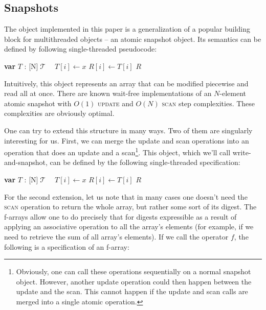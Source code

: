 \documentclass[a4paper,11pt]{article}
\def\T{\ensuremath{\operatorname{\mathcal{T}}}\text{ }}
\newcommand{\fn}[1]{\textsc{#1}}
\newcommand{\var}[2]{\textbf{var }#1 : #2}
\newcommand{\arrayspec}[1]{\text{array}[#1]\text{ of }}
\begin{document}
\subsection{Snapshots}

The object implemented in this paper is a generalization of a popular building block for multithreaded objects
-- an atomic snapshot object\cite{snapshot-idea}. Its semantics can be defined by following single-threaded pseudocode:

\begin{algorithmic}[1]
	\State\var{$T$}{\arrayspec{N}$\T$}
	\State $T[i] \gets x$
\EndFunction
{}
		\State $R[i] \gets T[i]$
	\EndFor
	\State\Return $R$
\EndFunction
\end{algorithmic}

Intuitively, this object represents an array that can be modified piecewise and read all at once.
There are known wait-free implementations of an $N$-element atomic snapshot with $O(1)$ \fn{update} and $O(N)$ \fn{scan} step complexities\cite{snapshot-impl}. These complexities are obviously
optimal.

One can try to extend this structure in many ways. Two of them are singularly interesting for us.
First, we can merge the update and scan operations
into an operation that does an update and a scan\footnote{Obviously, one can call these operations sequentially
on a normal snapshot object. However, another update operation could then happen between the update and the scan.
This cannot happen if the update and scan calls are merged into a single atomic operation.}.
This object, which we'll call write-and-snapshot\cite{write-and-snap}, can be defined by the following single-threaded specification:

\begin{algorithmic}[1]
	\State\var{$T$}{\arrayspec{N}$\T$}
	\State $T[i] \gets x$
		\State $R[i] \gets T[i]$
	\EndFor
	\State\Return $R$
\EndFunction
\end{algorithmic}

For the second extension, let us note that in many cases one doesn't need the \fn{scan} operation to return the whole array, but rather some sort of its digest. The f-arrays\cite{f-array} allow one to do precisely that for digests expressible as
a result of applying an associative operation to all the array's elements (for example, if we need to retrieve the sum of all array's elements). If we call the operator $f$, the following is a specification of an f-array:
\end{document}
